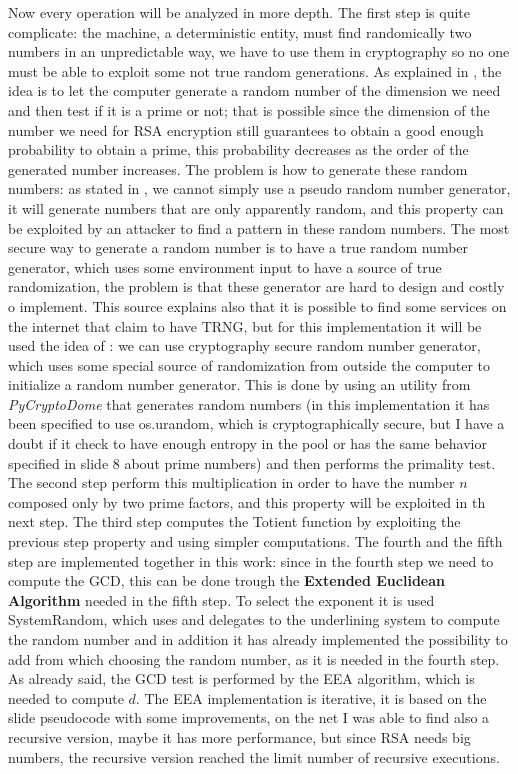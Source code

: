\documentclass{article}
\begin{document}
Now every operation will be analyzed in more depth.\newline
The first step is quite complicate: the machine, a deterministic entity, must find randomically two numbers in an unpredictable way, we have to use them in cryptography so no one must be able to exploit some not true random generations. As explained in \cite{primeNum}, the idea is to let the computer generate a random number of the dimension we need and then test if it is a prime or not; that is possible since the dimension of the number we need for RSA encryption still guarantees to obtain a good enough probability to obtain a prime, this probability decreases as the order of the generated number increases. The problem is how to generate these random numbers: as stated in \cite{TRNG}, we cannot simply use a pseudo random number generator, it will generate numbers that are only apparently random, and this property can be exploited by an attacker to find a pattern in these random numbers. The most secure way to generate a random number is to have a true random number generator, which uses some environment input to have a source of true randomization, the problem is that these generator are hard to design and costly o implement. This source \cite{TRNG} explains also that it is possible to find some services on the internet that claim to have TRNG, but for this implementation it will be used the idea of \cite{pyrandom}: we can use cryptography secure random number generator, which uses some special source of randomization from outside the computer to initialize a random number generator. This is done by using an utility from \textit{PyCryptoDome} that generates random numbers (in this implementation it has been specified to use os.urandom, which is cryptographically secure, but I have a doubt if it check to have enough entropy in the pool or has the same behavior specified in slide 8 about prime numbers) and then performs the primality test. \newline
The second step perform this multiplication in order to have the number $n$ composed only by two prime factors, and this property will be exploited in th next step. \newline
The third step computes the Totient function by exploiting the previous step property and using simpler computations. \newline
The fourth and the fifth step are implemented together in this work: since in the fourth step we need to compute the GCD, this can be done trough the \textbf{Extended Euclidean Algorithm} needed in the fifth step. To select the exponent it is used SystemRandom, which uses and delegates to the underlining system to compute the random number and in addition it has already implemented the possibility to add from which choosing the random number, as it is needed in the fourth step. As already said, the GCD test is performed by the EEA algorithm, which is needed to compute $d$. The EEA implementation is iterative, it is based on the slide pseudocode with some improvements, on the net I was able to find also a recursive version, maybe it has more performance, but since RSA needs big numbers, the recursive version reached the limit number of recursive executions.
\end{document}
